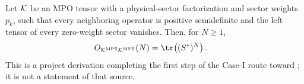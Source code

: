 \begin{lemma}
    \label{thm:mpdo_overlap_formula}
    \leanok
    Let ${\cal K}$ be an MPO tensor with a physical-sector factorization
    and sector weights $p_k$, such that every neighboring operator is
    positive semidefinite and the left tensor of every zero-weight sector
    vanishes. Then, for $N\geq1$,
    \begin{align}
        O_{{\cal K}^{\mathrm{MPS}}{\cal K}^{\mathrm{MPS}}}(N)
         & =\tr\!\left((S^*)^N\right).
        \notag
    \end{align}
    This is a project derivation completing the first step of the Case-I
    route toward
    \cite[Appendix~C.2, Lemma~C.5, lines~1473--1499]{Cirac2016MPDO_arXiv};
    it is not a statement of that source.
\end{lemma}

